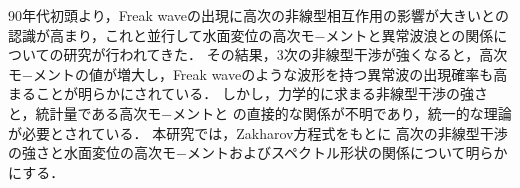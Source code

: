 \documentclass[11pt,dvipdfmx]{jarticle}
\begin{document}
\setlength{\baselineskip}{5.2mm}
90年代初頭より，Freak waveの出現に高次の非線型相互作用の影響が大きいとの
認識が高まり，これと並行して水面変位の高次モ−メントと異常波浪との関係に
ついての研究が行われてきた．
その結果，3次の非線型干渉が強くなると，高次モ−メントの値が増大し，Freak
waveのような波形を持つ異常波の出現確率も高まることが明らかにされている．
しかし，力学的に求まる非線型干渉の強さと，統計量である高次モ−メントと
の直接的な関係が不明であり，統一的な理論が必要とされている．
本研究では，Zakharov方程式をもとに
高次の非線型干渉の強さと水面変位の高次モ−メントおよびスペクトル形状の関係について明らかにする．
\end{document}
